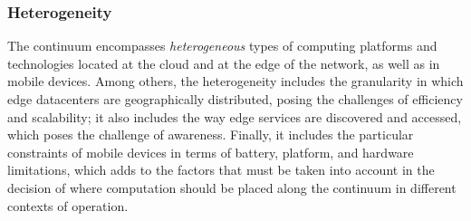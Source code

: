 \subsubsection*{Heterogeneity}\label{sec:heterogeneity}


The continuum encompasses \textit{heterogeneous} types of computing platforms and technologies located at the cloud and at the edge of the network, as well as in mobile devices. Among others, the heterogeneity includes the granularity in which edge datacenters are geographically distributed, posing the challenges of efficiency and scalability; it also includes the way edge services are discovered and accessed, which poses the challenge of awareness. Finally, it includes the particular constraints of mobile devices in terms of battery, platform, and hardware limitations, which adds to the factors that must be taken into account in the decision of where computation should be placed along the continuum in different contexts of operation.








